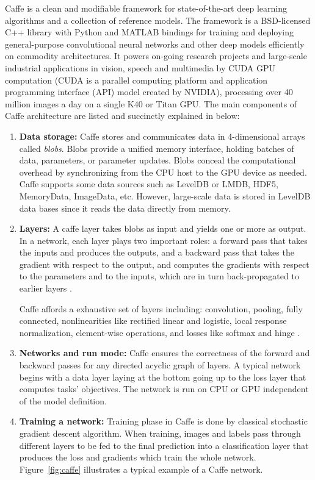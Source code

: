 Caffe is a clean and modifiable framework for state-of-the-art deep learning algorithms and a collection of reference models. The framework is a BSD-licensed C++ library with Python and MATLAB bindings for training and deploying general-purpose convolutional neural networks and other deep models efficiently on commodity architectures. It powers on-going research projects and large-scale industrial applications in vision, speech and multimedia by CUDA GPU computation (CUDA is a parallel computing platform and application programming interface (API) model created by NVIDIA\cite{cuda}), processing over 40 million images a day on a single K40 or Titan GPU\cite{jia2014caffe}. 
The main components of Caffe architecture are listed and succinctly explained in below:
\begin{enumerate}
\item \textbf{Data storage:} Caffe stores and communicates data in 4-dimensional arrays called \textit{blobs}. Blobs provide a unified memory interface, holding batches of data, parameters, or parameter updates. Blobs conceal the computational overhead by synchronizing from the CPU host to the GPU device as needed. Caffe supports some data sources such as LevelDB or LMDB, HDF5, MemoryData, ImageData, etc. However, large-scale data is stored in LevelDB data bases since it reads the data directly from memory\cite{caffe}. 
\item \textbf{Layers:} A caffe layer takes blobs as input and yields one or more as output. In a network, each layer plays two important roles: a forward pass that takes the inputs and produces the outputs, and a backward pass that takes the gradient with respect to the output, and computes the gradients with respect to the parameters and to the inputs, which are in turn back-propagated to earlier layers \cite{jia2014caffe}.

\indent Caffe affords a exhaustive set of layers including: convolution, pooling, fully connected, nonlinearities like rectified
linear and logistic, local response normalization, element-wise operations, and losses like softmax and hinge \cite{jia2014caffe}.  
\item \textbf{Networks and run mode:} Caffe ensures the correctness of the forward and backward passes for any directed acyclic graph of layers. A typical network begins with a data layer laying at the bottom going up to the loss layer that computes tasks' objectives. The network is run on CPU or GPU independent of the model definition. 
\item \textbf{Training a network:} Training phase in Caffe is done by classical stochastic gradient descent algorithm. When training, images and labels pass through different layers to be fed to the final prediction into a classification layer that produces the loss and gradients which train the whole network. Figure~\ref{fig:caffe} illustrates a typical example of a Caffe network. 


\end{enumerate}
